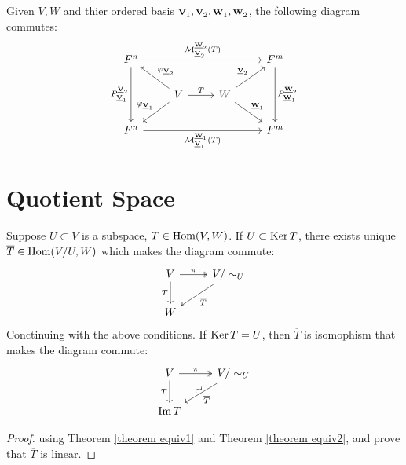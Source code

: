 \begin{theorem}
    Given $V, W$ and thier ordered basis $\bs{V}{1}, \bs{V}{2}, \bs{W}{1}, \bs{W}{2}$, the following diagram commutes:
    \[
        \begin{tikzcd}
            F^n \arrow[rrr, "\calM^{\bss{W}{2}}_{\bss{V}{2}}(T)"] \arrow[dd, "P^{\bss{V}{2}}_{\bss{V}{1}}"']
            &
            &
            & F^m \arrow[dd, "P^{\bss{W}{2}}_{\bss{W}{1}}"]
            \\
            & V \arrow[r, "T"] \arrow[lu, "\varphi_{\bss{V}{2}}"'] \arrow[ld, "\varphi_{\bss{V}{1}}"']
            & W \arrow[ru, "\bss{V}{2}"]  \arrow[rd, "\bss{W}{1}"]
            &
            \\
            F^n \arrow[rrr, "\calM^{\bss{W}{1}}_{\bss{V}{1}}(T)"']
            &
            &
            & F^m
        \end{tikzcd}
    \]
\end{theorem}









\section{Quotient Space}
\begin{theorem}
    \label{theorem 3.4.1}
    Suppose $U \subset V$ is a subspace, $T \in \operatorname{Hom}(V, W)$. If $U \subset \operatorname{Ker} T $, there exists unique $\overline{T} \in \operatorname{Hom}(V / U, W)$ which makes the diagram commute:
    \[
        \begin{tikzcd}
            V \arrow[two heads, r, "\pi"] \arrow[d, "T"']
            & V / \sim_U \arrow[ld, "\overline{T}"]
            \\
            W
        \end{tikzcd}
    \]
    Conctinuing with the above conditions. If $\operatorname{Ker} T = U$, then $\overline{T}$ is isomophism that makes the diagram commute:
    \[
        \begin{tikzcd}
            V \arrow[two heads, r, "\pi"] \arrow[d, "T"']
            & V / \sim_U \arrow[ld, "\overline{T}"] \arrow[ld, phantom, "\sim"', sloped, yshift=0.7ex]
            \\
            \Im T
        \end{tikzcd}
    \]
\end{theorem}


\begin{proof}
    using Theorem \ref{theorem equiv1} and Theorem \ref{theorem equiv2}, and prove that $\overline{T}$ is linear.
\end{proof}








